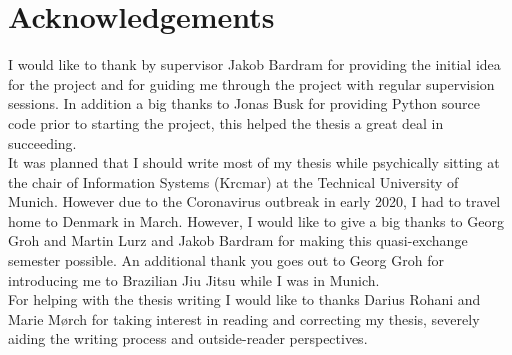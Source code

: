 \chapter{Acknowledgements}
I would like to thank by supervisor Jakob Bardram for providing the initial idea for the project and for guiding me through the project with regular supervision sessions. In addition a big thanks to Jonas Busk for providing Python source code prior to starting the project, this helped the thesis a great deal in succeeding.\\

It was planned that I should write most of my thesis while psychically sitting at the chair of Information Systems (Krcmar) at the Technical University of Munich. However due to the Coronavirus outbreak in early 2020, I had to travel home to Denmark in March. However, I would like to give a big thanks to Georg Groh and Martin Lurz and Jakob Bardram for making this quasi-exchange semester possible. An additional thank you goes out to Georg Groh for introducing me to Brazilian Jiu Jitsu while I was in Munich.\\

For helping with the thesis writing I would like to thanks Darius Rohani and Marie Mørch for taking interest in reading and correcting my thesis, severely aiding the writing process and outside-reader perspectives. \\



